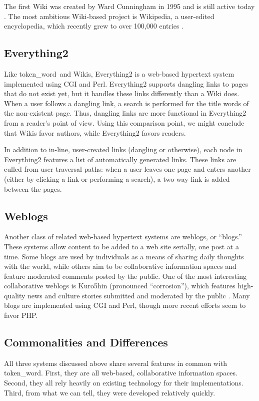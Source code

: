 \documentclass{acm_proc_article-sp}
\newcommand{\tokenWord}{token\_word}
\begin{document}
The first Wiki was created by Ward Cunningham in 1995 and is still active today \cite{WikiWikiWeb}.
The most ambitious Wiki-based project is Wikipedia, a user-edited encyclopedia, which recently grew to over 100,000 entries \cite{Wikipedia}.


\subsection{Everything2}
Like \tokenWord \  and Wikis, Everything2 \cite{Everything2} is a web-based hypertext system implemented using CGI and Perl.
Everything2 supports dangling links to pages that do not exist yet, but it handles these links differently than a Wiki does.
When a user follows a dangling link, a search is performed for the title words of the non-existent page.
Thus, dangling links are more functional in Everything2 from a reader's point of view.
Using this comparison point, we might conclude that Wikis favor authors, while Everything2 favors readers.

In addition to in-line, user-created links (dangling or otherwise), each node in Everything2 features a list of automatically generated links.
These links are culled from user traversal paths:  when a user leaves one page and enters another (either by clicking a link or performing a search), a two-way link is added between the pages.   


\subsection{Weblogs}
Another class of related web-based hypertext systems are weblogs, or ``blogs.''
These systems allow content to be added to a web site serially, one post at a time.
Some blogs are used by individuals as a means of sharing daily thoughts with the world, while others aim to be collaborative information spaces and feature moderated comments posted by the public.
One of the most interesting collaborative weblogs is Kuro5hin (pronounced ``corrosion''), which features high-quality news and culture stories submitted and moderated by the public \cite{kuro5hin}.
Many blogs are implemented using CGI and Perl, though more recent efforts seem to favor PHP.


\subsection{Commonalities and Differences}
All three systems discussed above share several features in common with \tokenWord.
First, they are all web-based, collaborative information spaces.
Second, they all rely heavily on existing technology for their implementations.
Third, from what we can tell, they were developed relatively quickly.
\end{document}
